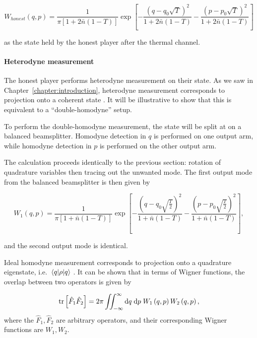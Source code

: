 \begin{equation}
W_{honest}\left(q, p\right) = \frac{1}{\pi \left[ 1 + 2 \bar{n} \left(1-T\right)\right]} \exp\left[ - \frac{\left(q - q_0 \sqrt{T}\right)^2}{1 + 2 \bar{n}\left(1-T\right)} - \frac{\left(p - p_0 \sqrt{T}\right)^2}{1 + 2 \bar{n} \left(1-T\right)} \right]
\end{equation}

\noindent as the state held by the honest player after the thermal channel.

\paragraph{Heterodyne measurement}

The honest player performs heterodyne measurement on their state. As we saw in Chapter~\ref{chapter:introduction}, heterodyne measurement corresponds to projection onto a coherent state \cite{Serafini2018, Weedbrook2012}. It will be illustrative to show that this is equivalent to a ``double-homodyne'' setup.

To perform the double-homodyne measurement, the state will be split at on a balanced beamsplitter. Homodyne detection in $q$ is performed on one output arm, while homodyne detection in $p$ is performed on the other output arm.

The calculation proceeds identically to the previous section: rotation of quadrature variables then tracing out the unwanted mode. The first output mode from the balanced beamsplitter is then given by

\begin{equation}
W_1\left(q, p\right) =  \frac{1}{\pi \left[ 1 + \bar{n}\left(1-T\right)\right]} \exp\left[- \frac{\left(q - q_0 \sqrt{\frac{T}{2}}\right)^2}{1 + \bar{n}\left(1-T\right)} - \frac{\left(p - p_0 \sqrt{\frac{T}{2}}\right)^2}{1 + \bar{n}\left(1-T\right)} \right],
\end{equation}

\noindent and the second output mode is identical.

Ideal homodyne measurement corresponds to projection onto a quadrature eigenstate, i.e. $\mel{q}{\rho}{q}$ \cite{Weedbrook2012, Serafini2019}. It can be shown \cite{Leonhardt2010} that in terms of Wigner functions, the overlap between two operators is given by

\begin{equation}
\tr\left[\hat{F}_1 \hat{F}_2 \right] = 2 \pi \iint_{-\infty}^\infty \mathrm{d}q \; \mathrm{d}p \; W_1\left(q, p\right) W_2\left(q, p\right),
\end{equation}
where the $\hat{F}_1, \hat{F}_2$ are arbitrary operators, and their corresponding Wigner functions are $W_1, W_2$.

